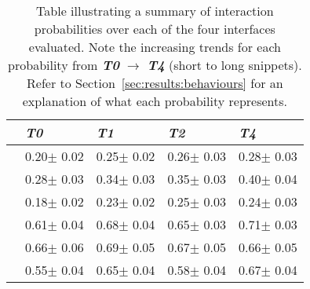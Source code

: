 \begin{table}[t]
    \caption{Table illustrating a summary of interaction probabilities over each of the four interfaces evaluated. Note the increasing trends for each probability from \textbf{\emph{T0}} $\rightarrow$ \textbf{\emph{T4}} (short to long snippets). Refer to Section~\ref{sec:results:behaviours} for an explanation of what each probability represents.\vspace{-3mm}}
    \label{tbl_probs}
    \renewcommand{\arraystretch}{1.4}
    \begin{center}
    \begin{tabulary}{\textwidth}{L{1cm}||D{1.4cm}|D{1.4cm}|D{1.4cm}|D{1.4cm}}
    \hline
    & \textbf{\emph{T0}} & \textbf{\emph{T1}} & \textbf{\emph{T2}} & \textbf{\emph{T4}}  \\ \hline\hline
    
    \textbf{} & 0.20$\pm$ 0.02 & 0.25$\pm$ 0.02 & 0.26$\pm$ 0.03 & 0.28$\pm$ 0.03 \\ \hline
    \textbf{} & 0.28$\pm$ 0.03 & 0.34$\pm$ 0.03 & 0.35$\pm$ 0.03 & 0.40$\pm$ 0.04 \\ \hline
    \textbf{} & 0.18$\pm$ 0.02 & 0.23$\pm$ 0.02 & 0.25$\pm$ 0.03 & 0.24$\pm$ 0.03 \\ \hline\hline
    \textbf{} & 0.61$\pm$ 0.04 & 0.68$\pm$ 0.04 & 0.65$\pm$ 0.03 & 0.71$\pm$ 0.03 \\ \hline
    \textbf{} & 0.66$\pm$ 0.06 & 0.69$\pm$ 0.05 & 0.67$\pm$ 0.05 & 0.66$\pm$ 0.05 \\ \hline
    \textbf{} & 0.55$\pm$ 0.04 & 0.65$\pm$ 0.04 & 0.58$\pm$ 0.04 & 0.67$\pm$ 0.04 \\ \hline
    \end{tabulary}
    \end{center}
\vspace{-2mm}
\end{table}

